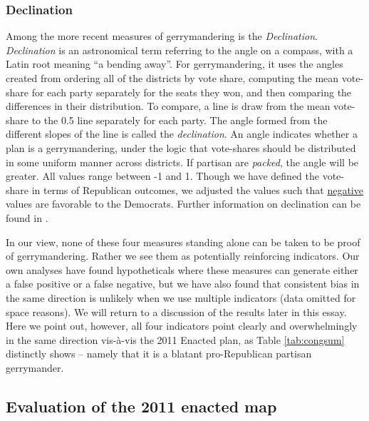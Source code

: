             \subsubsection*{Declination}
    Among the more recent measures of gerrymandering is the \textit{Declination}. \textit{Declination} is an astronomical term referring to the angle on a compass, with a Latin root meaning ``a bending away''. For gerrymandering, it uses the angles created from ordering all of the districts by vote share, computing the mean vote-share for each party separately for the seats they won, and then comparing the differences in their distribution. To compare, a line is draw from the mean vote-share to the 0.5 line separately for each party. The angle formed from the different slopes of the line is called the \textit{declination}. An angle indicates whether a plan is a gerrymandering, under the logic that vote-shares should be distributed in some uniform manner across districts. If partisan are \textit{packed}, the angle will be greater. All values range between -1 and 1. Though we have defined the vote-share in terms of Republican outcomes, we adjusted the values such that \underline{negative} values are favorable to the Democrats. Further information on declination can be found in \citet{Warrington2018}.  
\par
\par
    In our view, none of these four measures standing alone can be taken to be proof of gerrymandering. Rather we see them as potentially reinforcing indicators. Our own analyses have found hypotheticals where these measures can generate either a false positive or a false negative, but we have also found that consistent bias in the same direction is unlikely when we use multiple indicators (data omitted for space reasons). We will return to a discussion of the results later in this essay. Here we point out, however, all four indicators point clearly and overwhelmingly in the same direction vis-à-vis the 2011 Enacted plan, as Table \ref{tab:congsum} distinctly shows -- namely that it is a blatant pro-Republican partisan gerrymander.
\par
    \subsection*{Evaluation of the 2011 enacted map}
%
